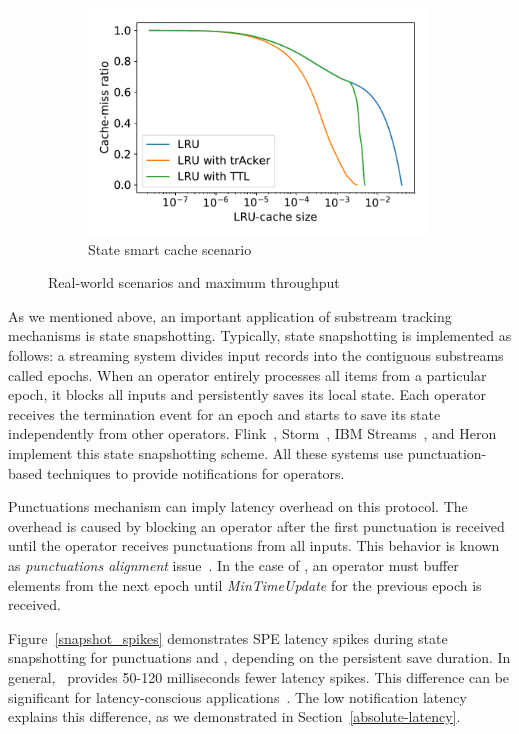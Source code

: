 \begin{figure}[t!]
\begin{subfigure}[b]{0.32\textwidth}
            \includegraphics[width=0.99\textwidth]{pics/dgc_lru_depth_search.pdf}
            \caption{State smart cache scenario}
            \label{fig:dgc_lru_depth_search}
    \end{subfigure}
    \caption{Real-world scenarios and maximum throughput}
    \label{various_experiments}
\end{figure}

As we mentioned above, an important application of substream tracking mechanisms is state snapshotting. Typically, state snapshotting is implemented as follows: a streaming system divides input records into the contiguous substreams called epochs. When an operator entirely processes all items from a particular epoch, it blocks all inputs and persistently saves its local state. Each operator receives the termination event for an epoch and starts to save its state independently from other operators. Flink~\cite{Carbone:2017:SMA:3137765.3137777}, Storm~\cite{apache:storm:state}, IBM Streams~\cite{jacques2016consistent}, and Heron~\cite{Kulkarni:2015:THS:2723372.2742788} implement this state snapshotting scheme. All these systems use punctuation-based techniques to provide notifications for operators.

Punctuations mechanism can imply latency overhead on this protocol. The overhead is caused by blocking an operator after the first punctuation is received until the operator receives punctuations from all inputs. This behavior is known as {\em punctuations alignment} issue~\cite{Carbone:2017:SMA:3137765.3137777}. In the case of \tracker , an operator must buffer elements from the next epoch until {\em MinTimeUpdate} for the previous epoch is received.

Figure~\ref{snapshot_spikes} demonstrates SPE latency spikes during state snapshotting for punctuations and \tracker, depending on the persistent save duration. In general, \tracker\ provides 50-120 milliseconds fewer latency spikes. This difference can be significant for latency-conscious applications~\cite{zhang2017sub}. The low notification latency explains this difference, as we demonstrated in Section~\ref{absolute-latency}. 

